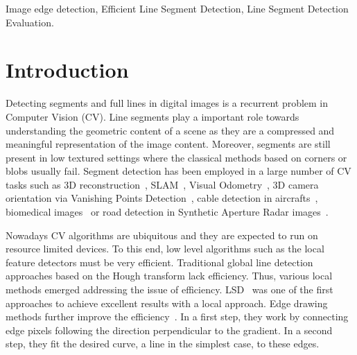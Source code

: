 \documentclass[preprint,12pt]{elsarticle}
\begin{document}
\begin{frontmatter}
\begin{keyword}
Image edge detection, Efficient Line Segment Detection, Line Segment Detection Evaluation.






\end{keyword}

\end{frontmatter}



\section{Introduction}
\label{sec:introduction}

Detecting segments and full lines in digital images is a recurrent problem in Computer Vision (CV). 
Line segments play a important role towards understanding the geometric content of a scene as they are a compressed and meaningful representation of the image content. Moreover, segments are still present in low textured settings where the classical methods based on corners or blobs usually fail.
Segment detection has been employed in a large number of CV tasks such as
3D reconstruction~\cite{zhou2019learning, miraldo2018minimal, li2017line}, 
SLAM~\cite{li2020structure, gomez2019pl, pumarola2017pl},
Visual Odometry~\cite{gomez2016pl}, 
3D camera orientation via Vanishing Points Detection~\cite{lezama2014finding, suarez2018fsg}, 
cable detection in aircrafts~\cite{tian2021noncontact}, 
biomedical images~\cite{santosh2017line} 
or road detection in Synthetic Aperture Radar images~\cite{Liu2020LSDSAR}.

Nowadays CV algorithms are ubiquitous and they are expected to run on resource limited devices. To this end, low level algorithms such as the local feature detectors must be very efficient. 
Traditional global line detection approaches based on the Hough transform lack efficiency. Thus, various local methods emerged addressing the issue of efficiency. LSD~\cite{grompone2010lsd} was one of the first approaches to achieve excellent results with a local approach. 
Edge drawing methods further improve the efficiency~\cite{topal2012edge, akinlar2011edlines, zhang2021ag3line}. In a first step, they work by connecting edge pixels following the direction perpendicular to the gradient. In a second step, they fit the desired curve, a line in the simplest case, to these edges.
\end{document}
